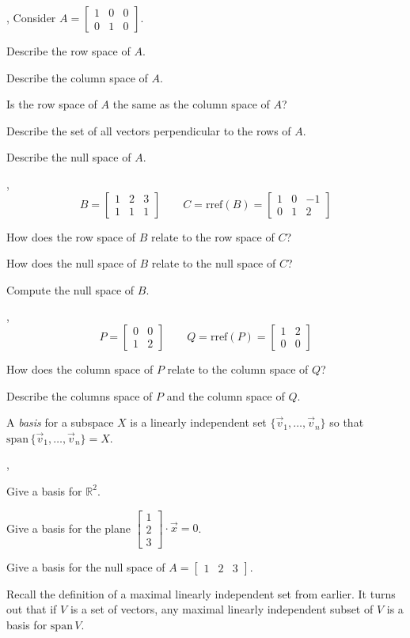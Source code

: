 \documentclass[letter]{article}
\newcommand{\R}{\mathbb{R}}
\renewcommand{\span}{\mathrm{span}\,}
\newcommand{\rref}{\mathrm{rref}}
\newcommand{\mat}[1]{\begin{bmatrix}#1\end{bmatrix}}
\newcommand{\sepl}{\sep \vspace{-.35in}}
\begin{document}
\sep
Consider $A=\mat{1&0&0\\0&1&0}$.
\begin{Enum}
	\item Describe the row space of $A$.
	\item Describe the column space of $A$.
	\item Is the row space of $A$ the same as the column space of $A$?
	\item Describe the set of all vectors perpendicular to the rows of $A$.
	\item Describe the null space of $A$.
\end{Enum}

\sep
\[
	B=\mat{1&2&3\\1&1&1}\qquad C=\rref(B)=\mat{1&0&-1\\0&1&2}
\]
\begin{Enum}
	\item How does the row space of $B$ relate to the row space of $C$?
	\item How does the null space of $B$ relate to the null space of $C$?
	\item Compute the null space of $B$.
\end{Enum}

\sep
\[
	P=\mat{0&0\\1&2}\qquad Q=\rref(P)=\mat{1&2\\0&0}
\]
\begin{Enum}
	\item How does the column space of $P$ relate to the column space of $Q$?
	\item Describe the columns space of $P$ and the column space of $Q$.
\end{Enum}

\begin{Def}
A \emph{basis} for a subspace $X$ is a linearly independent set $\{\vec v_1,\ldots,\vec v_n\}$
so that $\span\{\vec v_1,\ldots,\vec v_n\}=X$.
\end{Def}

\sepl
\begin{Enum}
	\item Give a basis for $\R^2$.
	\item Give a basis for the plane $\mat{1\\2\\3}\cdot \vec x=0$.
	\item Give a basis for the null space of $A=\mat{1&2&3}$.
\end{Enum}

Recall the definition of a maximal linearly independent set from earlier. It turns out
that if $V$ is a set of vectors, any maximal linearly independent subset of $V$ is a basis
for $\span V$.
\end{document}
